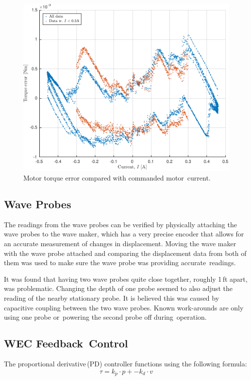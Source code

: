 \documentclass[hardware,article,submit,pdftex,moreauthors]{Definitions/mdpi}
\begin{document}
\begin{figure}[H]
  \centering
  \includegraphics[width=1\textwidth]{diagrams/torque_error_3.pdf}
  \caption{Motor torque error compared with commanded motor~current.} %
  \label{fig:TorqueError}
\end{figure}
\unskip

\subsection{Wave Probes}	\label{waveprobes}
The readings from the wave probes can be verified by physically attaching the wave probes to the wave maker, which has a very precise encoder that allows for an accurate measurement of changes in displacement.
Moving the wave maker with the wave probe attached and comparing the displacement data from both of them was used to make sure the wave probe was providing accurate~readings.

It was found that having two wave probes quite close together, roughly 1\,ft apart, was problematic.
Changing the depth of one probe seemed to also adjust the reading of the nearby stationary probe.
It is believed this was caused by capacitive coupling between the two wave probes.
Known work-arounds are only using one probe or~powering the second probe off during~operation.

\subsection{WEC Feedback~Control}
The proportional derivative\,(PD) controller functions using the following formula:
%
\begin{equation}  \label{pdctrleq}
  \tau = k_p \cdot p + -k_d \cdot v
\end{equation}
%
\end{document}
